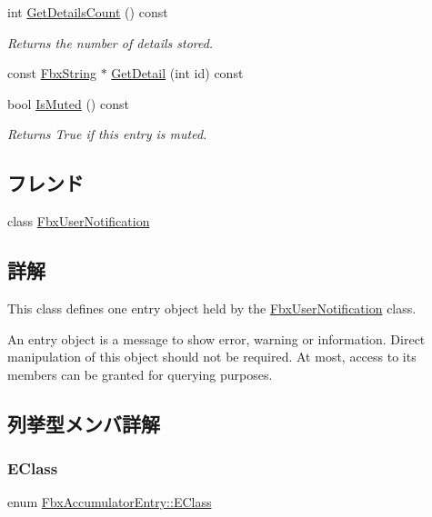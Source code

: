 \begin{DoxyCompactItemize}
int \hyperlink{class_fbx_accumulator_entry_adc709cecc41aa46b5874877c49f99b19}{Get\+Details\+Count} () const
\begin{DoxyCompactList}\small\item\em Returns the number of details stored. \end{DoxyCompactList}\item 
const \hyperlink{class_fbx_string}{Fbx\+String} $\ast$ \hyperlink{class_fbx_accumulator_entry_a1698d2ce0b959f30b912716a893cf274}{Get\+Detail} (int id) const
\item 
bool \hyperlink{class_fbx_accumulator_entry_ac7c575cce1b36df854f30ed8beb82260}{Is\+Muted} () const
\begin{DoxyCompactList}\small\item\em Returns True if this entry is muted. \end{DoxyCompactList}\end{DoxyCompactItemize}
\subsection*{フレンド}
\begin{DoxyCompactItemize}
\item 
class \hyperlink{class_fbx_accumulator_entry_a59b31f76d63ab836d795cdd0188a201a}{Fbx\+User\+Notification}
\end{DoxyCompactItemize}


\subsection{詳解}
This class defines one entry object held by the \hyperlink{class_fbx_user_notification}{Fbx\+User\+Notification} class.

An entry object is a message to show error, warning or information. Direct manipulation of this object should not be required. At most, access to its members can be granted for querying purposes. 

\subsection{列挙型メンバ詳解}
\mbox{\label{class_fbx_accumulator_entry_af08af3ddcbf7e8fe642d7e9ecb4ad0e2}} 
\subsubsection{\texorpdfstring{E\+Class}{EClass}}
{\footnotesize\ttfamily enum \hyperlink{class_fbx_accumulator_entry_af08af3ddcbf7e8fe642d7e9ecb4ad0e2}{Fbx\+Accumulator\+Entry\+::\+E\+Class}}

